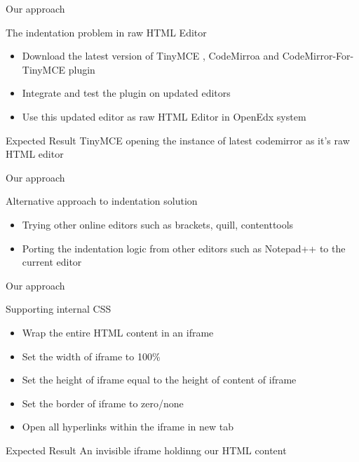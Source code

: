 \documentclass{beamer}
\begin{document}
	\begin{frame}{Our approach }
		\begin{block}{The indentation problem in raw HTML Editor }
			\begin{itemize}
				\item Download the latest version of TinyMCE , CodeMirroa and CodeMirror-For-TinyMCE plugin
				\item Integrate and test the plugin on updated editors
				\item Use this updated editor as raw HTML Editor in OpenEdx system
			\end{itemize}
		\end{block}
		\begin{block}{Expected Result }
			TinyMCE opening the instance of latest codemirror as it's raw HTML editor
		\end{block}
	\end{frame}
	
	\begin{frame}{Our approach }
		\begin{block}{Alternative approach to indentation solution }
			\begin{itemize}
				\item Trying other online editors such as brackets, quill, contenttools
				\item Porting the indentation logic from other editors such as Notepad++ to the current editor
			\end{itemize}
		\end{block}
	\end{frame}
	
	\begin{frame}{Our approach }
		\begin{block}{Supporting internal CSS }
			\begin{itemize}
				\item Wrap the entire HTML content in an iframe
				\item Set the width of iframe to 100\%
				\item Set the height of iframe equal to the height of content of iframe
				\item Set the border of iframe to zero/none
				\item Open all hyperlinks within the iframe in new tab
			\end{itemize}
		\end{block}
		\begin{block}{Expected Result}
			An invisible iframe holdinng our HTML content
		\end{block}
	\end{frame}
	
\end{document}
